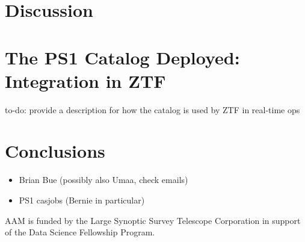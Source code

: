 \documentclass[twocolumn]{aastex62}
\newcommand{\todo}[1]{{\color{magenta} to-do: {#1}}}
\begin{document}
\section{Discussion}

\section{The PS1 Catalog Deployed: Integration in ZTF}

\todo{provide a description for how the catalog is used by ZTF in real-time ops}

\section{Conclusions}

\acknowledgements

\begin{itemize}
    \item Brian Bue (possibly also Umaa, check emails)
    \item PS1 casjobs (Bernie in particular)
\end{itemize}

AAM is funded by the Large Synoptic Survey Telescope Corporation in support of
the Data Science Fellowship Program.




\appendix




\end{document}
